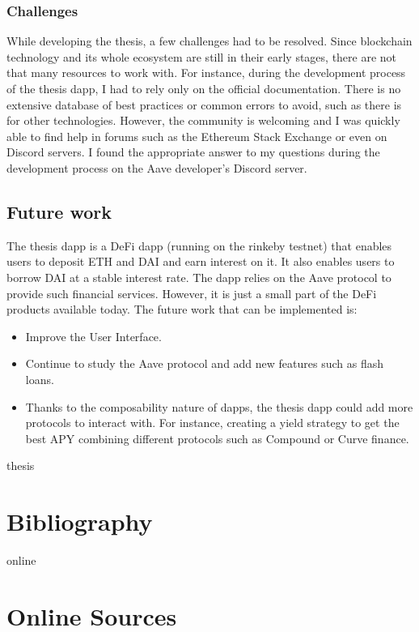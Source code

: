 \documentclass[11pt,a4paper]{report}
\begin{document}
\subsubsection{Challenges}
While developing the thesis, a few challenges had to be resolved. Since blockchain technology and its whole ecosystem are still in their early stages, there are not that many resources to work with. For instance, during the development process of the thesis dapp, I had to rely only on the official documentation. There is no extensive database of best practices or common errors to avoid, such as there is for other technologies. However, the community is welcoming and I was quickly able to find help in forums such as the Ethereum Stack Exchange\cite{ethstack} or even on Discord\cite{discord} servers. I found the appropriate answer to my questions during the development process on the Aave developer's Discord server.
\subsection{Future work}
The thesis dapp is a DeFi dapp (running on the rinkeby testnet) that enables users to deposit ETH and DAI and earn interest on it. It also enables users to borrow DAI at a stable interest rate. The dapp relies on the Aave protocol to provide such financial services. However, it is just a small part of the DeFi products available today.  The future work that can be implemented is:
\begin{itemize}
	\item Improve the User Interface.
	\item Continue to study the Aave protocol and add new features such as flash loans\cite{flashloan}.
	\item Thanks to the composability nature of dapps, the thesis dapp could add more protocols to interact with. For instance, creating a yield strategy to get the best APY combining different protocols such as Compound\cite{compound} or Curve finance\cite{curve}.
\end{itemize}

\newpage

\begin{btSect}{thesis} %
\section*{Bibliography}
\btPrintCited
\end{btSect}
\begin{btSect}{online}
\section*{Online Sources}
\btPrintCited
\end{btSect}
\end{document}
